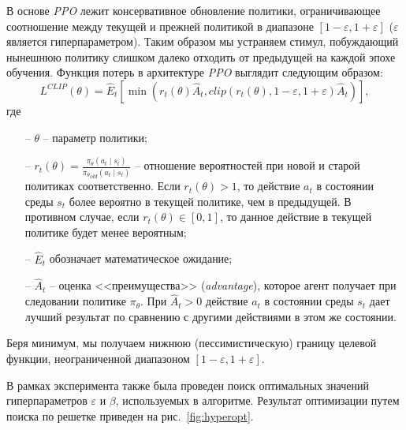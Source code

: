В основе \textit{PPO} лежит консервативное обновление политики, ограничивающее соотношение между текущей и прежней политикой в диапазоне \([1-\varepsilon, 1+\varepsilon]\) (\(\varepsilon\) является гиперпараметром). Таким образом мы устраняем стимул, побуждающий нынешнюю политику слишком далеко отходить от предыдущей на каждой эпохе обучения. Функция потерь в архитектуре \textit{PPO} выглядит следующим образом:
\begin{equation}
	L^{\textit{CLIP}}(\theta) = \hat{E}_t[\min(r_t(\theta)\hat{A}_t, \textit{clip}(r_t(\theta), 1 - \varepsilon, 1 + \varepsilon)\hat{A}_t)],
\end{equation} где 
\begin{itemize}
	\item[--] \(\theta\) -- параметр политики;
	\item[--] \(r_t(\theta) = \frac{\pi_\theta(a_t \mid s_t)}{{\pi_\theta}_{old}(a_t \mid s_t)}\) -- отношение вероятностей при новой и старой политиках соответственно. Если \(r_t(\theta) > 1\), то действие \(a_t\) в состоянии среды \(s_t\) более вероятно в текущей политике, чем в предыдущей. В противном случае, если \(r_t(\theta) \in [0, 1]\), то данное действие в текущей политике будет менее вероятным;
	\item[--] \(\hat{E}_t\) обозначает математическое ожидание;
	\item[--] \(\hat{A}_t\) -- оценка <<преимущества>> (\textit{advantage}), которое агент получает при следовании политике \(\pi_\theta\). При \(\hat{A}_t > 0\) действие \(a_t\) в состоянии среды \(s_t\) дает лучший результат по сравнению с другими действиями в этом же состоянии.
\end{itemize}

Беря минимум, мы получаем нижнюю (пессимистическую) границу целевой функции, неограниченной диапазоном \([1-\varepsilon, 1+\varepsilon]\).

В рамках эксперимента также была проведен поиск оптимальных значений гиперпараметров \(\varepsilon\) и \(\beta\), используемых в алгоритме. Результат оптимизации путем поиска по решетке приведен на рис.~\ref{fig:hyperopt}.

